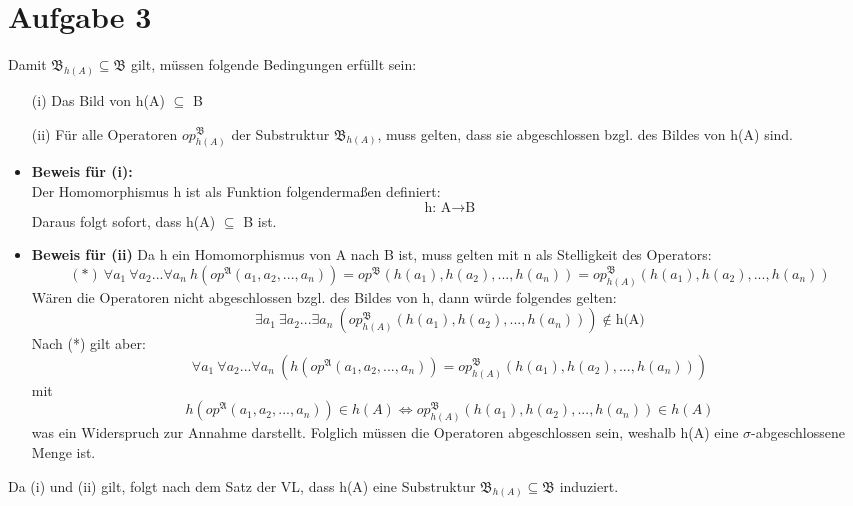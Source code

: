 \documentclass[a4paper,10pt]{article}
\begin{document}
\section*{Aufgabe 3}
Damit $\mathfrak{B}_{h(A)} \subseteq \mathfrak{B}$ gilt, müssen folgende Bedingungen erfüllt sein: 
\begin{enumerate}
\item[(i)]
	Das Bild von h(A) $\subseteq$ B 
\item[(ii)]
	Für alle Operatoren $op^\mathfrak{B}_{h(A)}$ der Substruktur $\mathfrak{B}_{h(A)}$, muss gelten, 
	dass sie abgeschlossen bzgl. des Bildes von h(A) sind.
\end{enumerate}
\begin{itemize}
	\item 	\textbf{Beweis für (i):}\\
		Der Homomorphismus h ist als Funktion folgendermaßen definiert: 
		\[\text{h: A}\rightarrow\text{B} \]
		Daraus folgt sofort, dass h(A) $\subseteq$ B ist. 
	\item  	\textbf{Beweis für (ii)}
		Da h ein Homomorphismus von A  nach B ist, muss gelten mit n als Stelligkeit des Operators: 
		\[ (*)~ \forall a_1~ \forall a_2 ... \forall a_n~ h(op^{\mathfrak{A}}(a_1,a_2,...,a_n)) 
		= op^{\mathfrak{B}}(h(a_1),h(a_2),...,h(a_n)) 
		= op^{\mathfrak{B}}_{h(A)}(h(a_1),h(a_2),...,h(a_n))\] 
Wären die Operatoren nicht abgeschlossen bzgl. des Bildes von h, dann würde folgendes gelten: 
\[\exists a_1~ \exists a_2 ... \exists a_n~ (op^\mathfrak{B}_{h(A)} (h(a_1),h(a_2),...,h(a_n))) \notin \text{h(A)} \]
Nach (*) gilt aber: 
\[\forall a_1~ \forall a_2 ... \forall a_n~ 
(h(op^{\mathfrak{A}}(a_1,a_2,...,a_n)) = op^{\mathfrak{B}}_{h(A)}(h(a_1),h(a_2),...,h(a_n)) )\] mit
\[h(op^{\mathfrak{A}}(a_1,a_2,...,a_n)) \in h(A) \Leftrightarrow op^{\mathfrak{B}}_{h(A)}(h(a_1),h(a_2),...,h(a_n)) \in h(A)\]
was ein Widerspruch zur Annahme darstellt. Folglich müssen die Operatoren abgeschlossen sein, weshalb h(A) eine $\sigma$-abgeschlossene Menge ist. 
\end{itemize}
Da (i) und (ii) gilt, folgt nach dem Satz der VL, dass h(A) eine Substruktur $\mathfrak{B}_{h(A)} \subseteq \mathfrak{B}$ induziert.
\end{document}
